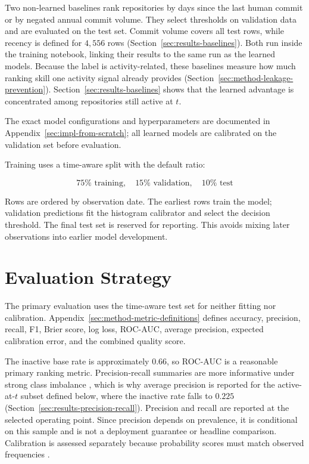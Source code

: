 Two non-learned baselines rank repositories by days since the last human commit
or by negated annual commit volume. They select thresholds on validation data and
are evaluated on the test set. Commit volume covers all test rows, while recency
is defined for \(4{,}556\) rows (Section~\ref{sec:results-baselines}). Both run
inside the training notebook, linking their results to the same run as the
learned models. Because the label is activity-related, these baselines measure
how much ranking skill one activity signal already provides
(Section~\ref{sec:method-leakage-prevention}). Section~\ref{sec:results-baselines}
shows that the learned advantage is concentrated among repositories still active
at \(t\).

The exact model configurations and hyperparameters are documented in Appendix~\ref{sec:impl-from-scratch}; all learned models are calibrated on the validation set before evaluation.

Training uses a time-aware split with the default ratio:

\[
75\% \text{ training}, \quad 15\% \text{ validation}, \quad 10\% \text{ test}
\]

Rows are ordered by observation date. The earliest rows train the model;
validation predictions fit the histogram calibrator and select the decision
threshold. The final test set is reserved for reporting. This avoids mixing later
observations into earlier model development.

\section{Evaluation Strategy}
\label{sec:method-evaluation-strategy}

The primary evaluation uses the time-aware test set for neither fitting nor
calibration. Appendix~\ref{sec:method-metric-definitions} defines accuracy,
precision, recall, F1, Brier score, log loss, ROC-AUC, average precision,
expected calibration
error, and the combined quality score.

The inactive base rate is approximately 0.66, so ROC-AUC is a reasonable primary
ranking metric. Precision-recall summaries are more informative under strong class
imbalance \cite{saito2015precision}, which is why average precision is reported
for the active-at-\(t\) subset defined below, where the inactive rate falls to
\(0.225\) (Section~\ref{sec:results-precision-recall}). Precision and recall are reported at the
selected operating point. Since precision depends on prevalence, it is
conditional on this sample and is not a deployment guarantee or headline
comparison. Calibration is assessed separately because probability scores must
match observed frequencies \cite{niculescu2005probabilities}.

